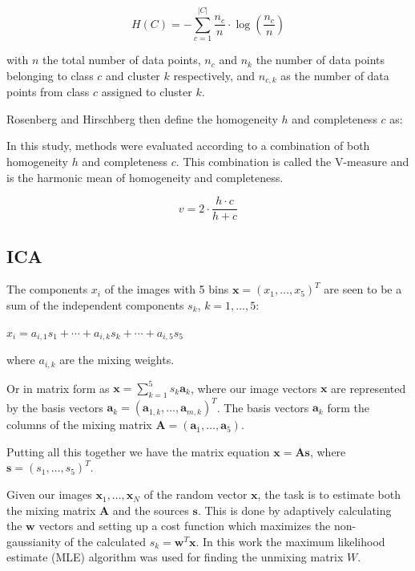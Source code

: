 \documentclass[a4paper,11pt]{article}
\begin{document}
\begin{equation}
H(C) = - \sum_{c=1}^{|C|} \frac{n_c}{n} \cdot \log\left(\frac{n_c}{n}\right)
\end{equation}

with $n$ the total number of data points, $n_c$ and $n_k$ the number of data points belonging to class $c$ and cluster $k$ respectively, and $n_{c,k}$ as the number of data points from class $c$ assigned to cluster $k$.

Rosenberg and Hirschberg then define the homogeneity $h$ and completeness $c$ as:

    



In this study, methods were evaluated according to a combination of both homogeneity $h$ and completeness $c$. This combination is called the V-measure and is the harmonic mean of homogeneity and completeness.

\begin{equation}
v = 2 \cdot \frac{h \cdot c}{h + c}
\end{equation}

\subsection{ICA}

The components $x_i$ of the images with 5 bins $\boldsymbol{x}=(x_1,\ldots,x_5)^T$ are seen to be a sum of the independent components $s_k$, $k=1,\ldots,5$:

$x_i = a_{i,1} s_1 + \cdots + a_{i,k} s_k + \cdots + a_{i,5} s_5$

where $a_{i,k}$ are the mixing weights.

Or in matrix form as $\boldsymbol{x}=\sum_{k=1}^{5} s_k \boldsymbol{a}_k$, where our image vectors $\boldsymbol{x}$ are represented by the basis vectors $\boldsymbol{a}_k=(\boldsymbol{a}_{1,k},\ldots,\boldsymbol{a}_{m,k})^T$. The basis vectors $\boldsymbol{a}_k$ form the columns of the mixing matrix $\boldsymbol{A}=(\boldsymbol{a}_1,\ldots,\boldsymbol{a}_5)$.

Putting all this together we have the matrix equation $\boldsymbol{x}=\boldsymbol{A} \boldsymbol{s}$, where $\boldsymbol{s}=(s_1,\ldots,s_5)^T$.

Given our images $\boldsymbol{x}_1,\ldots,\boldsymbol{x}_N$ of the random vector $\boldsymbol{x}$, the task is to estimate both the mixing matrix $\boldsymbol{A}$ and the sources $\boldsymbol{s}$. This is done by adaptively calculating the $\boldsymbol{w}$ vectors and setting up a cost function which maximizes the non-gaussianity of the calculated $s_k = \boldsymbol{w}^T \boldsymbol{x}$. In this work 
the maximum likelihood estimate (MLE) algorithm was used for finding the unmixing matrix $W$. 









\vfill









\end{document}
